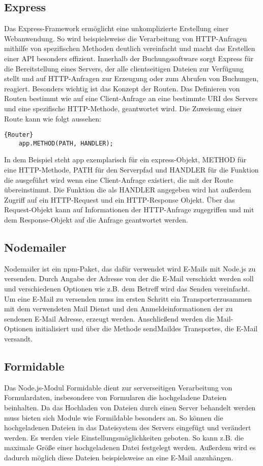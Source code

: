 \subsection{Express}
Das Express-Framework ermöglicht eine unkomplizierte Erstellung einer Webanwendung. So wird beispielsweise die Verarbeitung von HTTP-Anfragen mithilfe von spezifischen Methoden deutlich vereinfacht und macht das Erstellen einer API besonders effizient. Innerhalb der Buchungssoftware sorgt Express für die Bereitstellung eines Servers, der alle clientseitigen Dateien zur Verfügung stellt und auf HTTP-Anfragen zur Erzeugung oder zum Abrufen von Buchungen, reagiert. Besonders wichtig ist das Konzept der Routen. Das Definieren von Routen bestimmt wie auf eine Client-Anfrage an eine bestimmte URI des Servers und eine spezifische HTTP-Methode, geantwortet wird. Die Zuweisung einer Route kann wie folgt aussehen: 
\begin{lstlisting}{Router}
	app.METHOD(PATH, HANDLER);
\end{lstlisting}
In dem Beispiel steht app exemplarisch für ein express-Objekt, METHOD für eine HTTP-Methode, PATH für den Serverpfad und HANDLER für die Funktion die ausgeführt wird wenn eine Client-Anfrage existiert, die mit der Route übereinstimmt. Die Funktion die als HANDLER angegeben wird hat außerdem Zugriff auf ein HTTP-Request und ein HTTP-Response Objekt. Über das Request-Objekt kann auf Informationen der HTTP-Anfrage zugegriffen und mit dem Response-Objekt auf die Anfrage geantwortet werden.


\subsection{Nodemailer}
Nodemailer ist ein \glqq npm\grqq-Paket, das dafür verwendet wird E-Mails mit Node.js zu versenden. Durch Angabe der Adresse von der die E-Mail verschickt werden soll und verschiedenen Optionen wie z.B. dem Betreff wird das Senden vereinfacht. Um eine E-Mail zu versenden muss im ersten Schritt ein \glqq Transporter\grqq zusammen mit dem verwendeten Mail Dienst und den Anmeldeinformationen der zu sendenen E-Mail Adresse, erzeugt werden. Anschließend werden die Mail-Optionen initialisiert und über die Methode \glqq sendMail\grqq des Transportes, die E-Mail versandt.

\subsection{Formidable}
Das Node.js-Modul Formidable dient zur serverseitigen Verarbeitung von Formulardaten, insbesondere von Formularen die hochgeladene Dateien beinhalten. Da das Hochladen von Dateien durch einen Server behandelt werden muss bieten sich Module wie Formildable besonders an. So können die hochgeladenen Dateien in das Dateisystem des Servers eingefügt und verändert werden. Es werden viele Einstellungsmöglichkeiten geboten. So kann z.B. die maximale Größe einer hochgeladenen Datei festgelegt werden. Außerdem wird es dadurch möglich diese Dateien beispielsweise an eine E-Mail anzuhängen.

